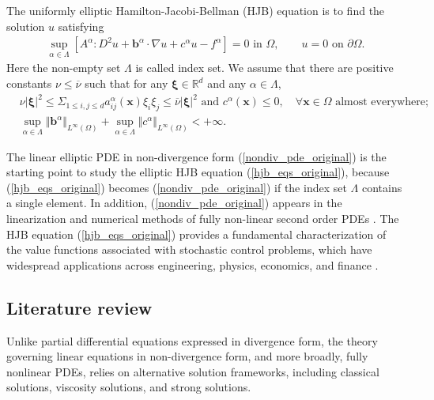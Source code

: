 \documentclass[12pt]{amsart}
\newcommand{\boldx}{\boldsymbol{x}}
\theoremstyle{definition}
\theoremstyle{remark}
\begin{document}
The uniformly elliptic Hamilton-Jacobi-Bellman (HJB) equation is to find the solution $u$ satisfying 
\begin{align}
\label{hjb_eqs_original}
\sup_{\alpha \in \Lambda} [A^{\alpha}:D^{2}u 
+ \boldsymbol{b}^{\alpha}\cdot \nabla u + c^{\alpha}u - f^{\alpha}] = 0 \text{ in } \Omega,
\qquad u = 0 \text{ on } \partial\Omega.
\end{align}
Here the non-empty set $\Lambda$ is called index set.
We assume that there are positive constants $\nu \leq \overline{\nu}$ such that 
for any $\boldsymbol{\xi} \in \mathbb{R}^{d}$ and any $\alpha \in \Lambda$,
\begin{align}
\label{hjb_uniform_ellipticity}
& \nu \vert \boldsymbol{\xi}\vert^{2} \leq \Sigma_{1 \leq i,j \leq d} 
a_{ij}^{\alpha}(\boldx) \xi_{i} \xi_{j} \leq \overline{\nu} 
\vert \boldsymbol{\xi}\vert^{2} \text{ and } 
c^{\alpha}(\boldx) \leq 0, \quad \forall 
\boldx \in \Omega \text{ almost everywhere}; \\
\label{hjb_coeffs_bounds}
& \sup_{\alpha \in \Lambda} \Vert \boldsymbol{b}^{\alpha}
\Vert_{L^{\infty}(\Omega)} + \sup_{\alpha \in \Lambda} 
\Vert c^{\alpha}\Vert_{L^{\infty}(\Omega)}  < + \infty.
\end{align}

The linear elliptic PDE in non-divergence form (\ref{nondiv_pde_original}) is the starting point to 
study the elliptic HJB equation (\ref{hjb_eqs_original}), because (\ref{hjb_eqs_original}) becomes 
(\ref{nondiv_pde_original}) if the index set $\Lambda$ contains a single element.
In addition, (\ref{nondiv_pde_original}) appears in the linearization and numerical methods of fully non-linear 
second order PDEs \cite{Caffarelli1,FN1,Neilan1}. 
The HJB equation (\ref{hjb_eqs_original}) provides a fundamental characterization of the value functions 
associated with stochastic control problems, which have widespread applications across engineering, physics, 
economics, and finance \cite{FS1,JensenSmears2013}.

\subsection{Literature review}

Unlike partial differential equations expressed in divergence form, the theory governing linear equations 
in non-divergence form, and more broadly, fully nonlinear PDEs, relies on alternative solution frameworks, 
including classical solutions, viscosity solutions, and strong solutions. 
\end{document}
